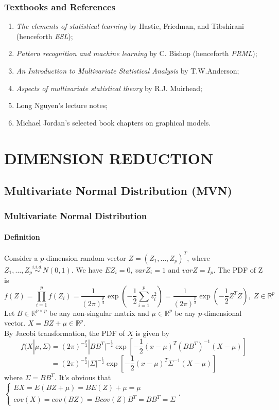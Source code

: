 \documentclass[12pt]{book}
\theoremstyle{definition}
\theoremstyle{remark}
\newcommand{\R}{\mathbb{R}}
\begin{document}
\section{Textbooks and References}
\begin{enumerate}
    \item \textit{The elements of statistical learning} by Hastie, Friedman, and Tibshirani (henceforth \textit{ESL});
    \item \textit{Pattern recognition and machine learning} by C. Bishop (henceforth \textit{PRML});
    \item \textit{An Introduction to Multivariate Statistical Analysis} by T.W.Anderson;
    \item \textit{Aspects of multivariate statistical theory} by R.J. Muirhead;
    \item Long Nguyen’s lecture notes;
    \item Michael Jordan’s selected book chapters on graphical models.
\end{enumerate}





\newpage
\part{DIMENSION REDUCTION}
\chapter{Multivariate Normal Distribution (MVN)}

\section{Multivariate Normal Distribution}

\subsection{Definition}
Consider a $p$-dimension random vector $Z = (Z_1, \dots, Z_p)^T$, where $Z_1,\dots, Z_p \overset{i.i.d.}{\sim} N(0,1)$. We have $EZ_i=0$, $varZ_i = 1$ and $var Z= I_p$. The PDF of Z is 
\[f(Z) = \prod_{i=1}^p f(Z_i) = \frac{1}{(2\pi)^{\frac{p}{2}}}\exp(-\frac{1}{2}\sum_{i=1}^p z_i^2) = \frac{1}{(2\pi)^{\frac{p}{2}}}\exp(-\frac{1}{2}Z^TZ),\; Z\in \R^p\]
Let $B\in\R^{p\times p}$ be any non-singular matrix and $\mu \in \R^p$ be any $p$-dimensional vector. $X=BZ+\mu \in \R^p$.\\
By Jacobi transformation, the PDF of $X$ is given by
\[f(X|\mu, \Sigma) = (2\pi)^{-\frac{p}{2}}|BB^T|^{-\frac{1}{2}}\exp[-\frac{1}{2}(x-\mu)^T(BB^T)^{-1}(X-\mu)]\]
\[ = (2\pi)^{-\frac{p}{2}}|\Sigma|^{-\frac{1}{2}}\exp[-\frac{1}{2}(x-\mu)^T\Sigma^{-1}(X-\mu)]\]
where $\Sigma = BB^T$. It's obvious that $\begin{cases}EX = E(BZ+\mu) = BE(Z)+\mu = \mu
 \\cov(X) = cov(BZ) = Bcov(Z)B^T = BB^T = \Sigma \end{cases}$.
\end{document}

